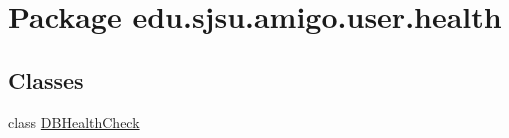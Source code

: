 \hypertarget{namespaceedu_1_1sjsu_1_1amigo_1_1user_1_1health}{}\section{Package edu.\+sjsu.\+amigo.\+user.\+health}
\label{namespaceedu_1_1sjsu_1_1amigo_1_1user_1_1health}
\subsection*{Classes}
\begin{DoxyCompactItemize}
\item 
class \hyperlink{classedu_1_1sjsu_1_1amigo_1_1user_1_1health_1_1_d_b_health_check}{D\+B\+Health\+Check}
\end{DoxyCompactItemize}
